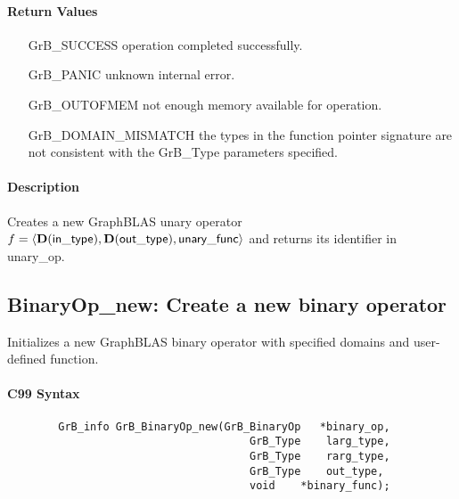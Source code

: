 \paragraph{Return Values}

\begin{itemize}[leftmargin=2.1in]
\item[{\sf GrB\_SUCCESS}]           operation completed successfully.
\item[{\sf GrB\_PANIC}]             unknown internal error.
\item[{\sf GrB\_OUTOFMEM}]          not enough memory available for operation.
\item[{\sf GrB\_DOMAIN\_MISMATCH}]  the types in the function pointer signature are not   
                                    consistent with the {\sf GrB\_Type} parameters specified.
\end{itemize}

\paragraph{Description}

Creates a new GraphBLAS unary operator $f = \langle \bold{D}({\sf in\_type}), 
\bold{D}({\sf out\_type}), {\sf unary\_func} \rangle$ and returns its identifier 
in {\sf unary\_op}.




\subsection{{\sf BinaryOp\_new}: Create a new binary operator}

Initializes a new GraphBLAS binary operator with specified domains and user-defined function.

\paragraph{C99 Syntax}

\begin{verbatim}
        GrB_info GrB_BinaryOp_new(GrB_BinaryOp   *binary_op,
                                      GrB_Type    larg_type,
                                      GrB_Type    rarg_type,
                                      GrB_Type    out_type,
                                      void    *binary_func);
\end{verbatim}

